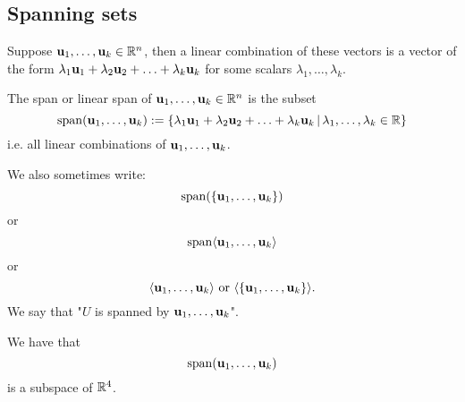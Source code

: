 \documentclass[10pt, a4paper]{article}
\begin{document}
\subsection{Spanning sets}
Suppose $\mathbf{u}_1, \dotsc, \mathbf{u}_k \in \mathbb{R} ^ n$,
then a linear combination of these vectors is a vector of the form
$\lambda_1\mathbf{u}_1 + \lambda_2\mathbf{u}_2 + \dotsc + \lambda_k\mathbf{u}_k$ for some scalars $\lambda_1, \dotsc, \lambda_k$.

\begin{definition}
    The span or linear span of $\mathbf{u}_1, \dotsc, \mathbf{u}_k \in \mathbb{R} ^ n$ is the subset
    \[
    \mathrm{span}(\mathbf{u}_1, \dotsc, \mathbf{u}_k) := \{\lambda_1\mathbf{u}_1 + \lambda_2\mathbf{u}_2 + \dotsc + \lambda_k\mathbf{u}_k\,|\, \lambda_1, \dotsc, \lambda_k \in \mathbb{R}\}
    \]
    i.e. all linear combinations of $\mathbf{u}_1, \dotsc, \mathbf{u}_k$.
\end{definition}
We also sometimes write:
\[
\mathrm{span}(\{\mathbf{u}_1, \dotsc, \mathbf{u}_k\})
\]
or
\[
\mathrm{span}\langle\mathbf{u}_1, \dotsc, \mathbf{u}_k\rangle
\]
or
\[
\langle\mathbf{u}_1, \dotsc, \mathbf{u}_k\rangle\text{ or } \langle\{\mathbf{u}_1, \dotsc, \mathbf{u}_k\}\rangle.
\]
We say that "$U$ is spanned by $\mathbf{u}_1, \dotsc, \mathbf{u}_k$".

\begin{proposition}
    We have that
    \[
    \mathrm{span}(\mathbf{u}_1, \dotsc, \mathbf{u}_k)
    \]
    is a subspace of $\mathbb{R} ^ 4$.
\end{proposition}
\end{document}
